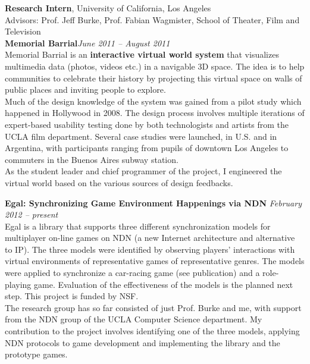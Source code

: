 \documentclass[margin,line]{resume}
\begin{document}
\begin{resume}
    \textbf{Research Intern}, University of California, Los Angeles \\%
    Advisors: Prof. Jeff Burke, Prof. Fabian Wagmister, School of Theater, Film and Television \vspace{2mm}\\
    \textbf{Memorial Barrial}\hfill \textsl{June 2011 -- August 2011}\\
    Memorial Barrial is an \textbf{interactive virtual world system} that visualizes multimedia data (photos, videos etc.) in a navigable 3D space. The idea is to help communities to celebrate their history by projecting this virtual space on walls of public places and inviting people to explore. \\
    Much of the design knowledge of the system was gained from a pilot study which happened in Hollywood in 2008. The design process involves multiple iterations of expert-based usability testing done by both technologists and artists from the UCLA film department. Several case studies were launched, in U.S. and in Argentina, with participants ranging from pupils of downtown Los Angeles to commuters in the Buenos Aires subway station. \\
    As the student leader and chief programmer of the project, I engineered the virtual world based on the various sources of design feedbacks.
    
    \textbf{Egal: Synchronizing Game Environment Happenings via NDN} \hfill \textsl{February 2012 -- present}\\
    Egal is a library that supports three different synchronization models for multiplayer on-line games on NDN (a new Internet architecture and alternative to IP). The three models were identified by observing players' interactions with virtual environments of representative games of representative genres. The models were applied to synchronize a car-racing game (see publication) and a role-playing game. Evaluation of the effectiveness of the models is the planned next step. This project is funded by NSF. \\
   The research group has so far consisted of just Prof. Burke and me, with support from the NDN group of the UCLA Computer Science department. My contribution to the project involves identifying one of the three models, applying NDN protocols to game development and implementing the library and the prototype games.


\end{resume}
\end{document}
